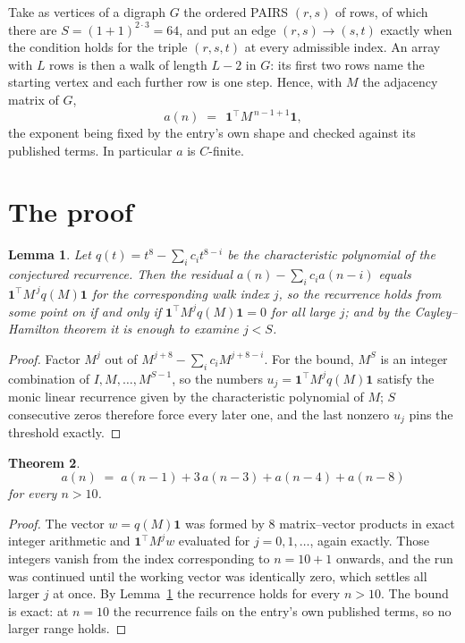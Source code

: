 \documentclass[11pt,a4paper]{article}
\theoremstyle{plain}
\newtheorem{theorem}{Theorem}
\newtheorem{lemma}[theorem]{Lemma}
\theoremstyle{definition}
\begin{document}
Take as vertices of a digraph $G$ the ordered PAIRS $(r,s)$ of rows, of which there are
$S=(1+1)^{2\cdot3}=64$, and put an edge $(r,s)\to(s,t)$ exactly when the condition
holds for the triple $(r,s,t)$ at every admissible index. An array with $L$ rows is then a
walk of length $L-2$ in $G$: its first two rows name the starting vertex and each further
row is one step. Hence, with $M$ the adjacency matrix of $G$,
\[
a(n)\;=\;\,\mathbf{1}^{\!\top}M^{\,n-1+1}\mathbf{1},
\]
the exponent being fixed by the entry's own shape and checked against its published terms.
In particular $a$ is $C$-finite.

\section{The proof}

\begin{lemma}\label{lem:crit}
Let $q(t)=t^{8}-\sum_i c_it^{8-i}$ be the characteristic polynomial of the
conjectured recurrence. Then the residual $a(n)-\sum_ic_ia(n-i)$ equals
$\mathbf{1}^{\!\top}M^{\,j}q(M)\mathbf{1}$ for the corresponding walk index
$j$, so the recurrence holds from some point on if and only if
$\mathbf{1}^{\!\top}M^{j}q(M)\mathbf{1}=0$ for all large $j$; and by the
Cayley--Hamilton theorem it is enough to examine $j<S$.
\end{lemma}

\begin{proof}
Factor $M^{j}$ out of $M^{j+8}-\sum_ic_iM^{j+8-i}$. For the bound, $M^{S}$
is an integer combination of $I,M,\dots,M^{S-1}$, so the numbers
$u_j=\mathbf{1}^{\!\top}M^{j}q(M)\mathbf{1}$ satisfy the monic linear recurrence given by
the characteristic polynomial of $M$; $S$ consecutive zeros therefore force every later one,
and the last nonzero $u_j$ pins the threshold exactly.
\end{proof}

\begin{theorem}
\[
a(n)\;=\;a(n-1) + 3\,a(n-3) + a(n-4) + a(n-8)
\]
for every $n>10$.
\end{theorem}

\begin{proof}
The vector $w=q(M)\mathbf{1}$ was formed by $8$ matrix--vector products in exact
integer arithmetic and $\mathbf{1}^{\!\top}M^{j}w$ evaluated for $j=0,1,\dots$, again
exactly. Those integers vanish from the index corresponding to $n=10+1$ onwards, and the
run was continued until the working vector was identically zero, which settles all larger $j$
at once. By Lemma~\ref{lem:crit} the recurrence holds for every $n>10$. The bound is exact: at $n=10$ the recurrence fails on the entry's own published terms, so no larger range holds.
\end{proof}
\end{document}
